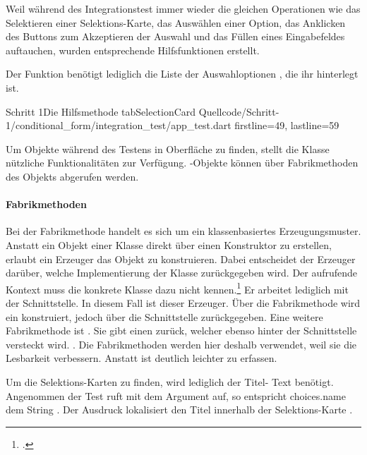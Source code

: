 Weil während des Integrationstest immer wieder die gleichen Operationen wie das Selektieren einer Selektions-Karte, das Auswählen einer Option, das Anklicken des Buttons zum Akzeptieren der Auswahl und das Füllen eines Eingabefeldes auftauchen, wurden entsprechende Hilfsfunktionen erstellt.


Der Funktion  \Lst{\ref{lst:Schritt1HilfsmethodeTabSelectionCard}} benötigt lediglich die Liste der Auswahloptionen , die ihr hinterlegt ist.
 

\begin{alexlisting}{Schritt 1}{Die Hilfsmethode tabSelectionCard}
  {Quellcode/Schritt-1/conditional_form/integration_test/app_test.dart}
  {firstline=49, lastline=59}
  \label{lst:Schritt1HilfsmethodeTabSelectionCard}
\end{alexlisting}

Um Objekte während des Testens in Oberfläche zu finden, stellt die Klasse  nützliche Funktionalitäten zur Verfügung.
-Objekte können über Fabrikmethoden des Objekts  abgerufen werden.

\paragraph{Fabrikmethoden}
Bei der Fabrikmethode handelt es sich um ein klassenbasiertes Erzeugungsmuster.
Anstatt ein Objekt einer Klasse direkt über einen Konstruktor zu erstellen, erlaubt ein Erzeuger das Objekt zu konstruieren.
Dabei entscheidet der Erzeuger darüber, welche Implementierung der Klasse zurückgegeben wird.
Der aufrufende Kontext muss die konkrete Klasse dazu nicht kennen.\footcite[Vgl.][107-116]{gamma2009entwurfsmuster} Er arbeitet lediglich mit der Schnittstelle. In diesem Fall ist  dieser Erzeuger. Über die Fabrikmethode  wird ein  konstruiert, jedoch über die Schnittstelle  zurückgegeben. Eine weitere Fabrikmethode ist . Sie gibt einen  zurück, welcher ebenso hinter der Schnittstelle  versteckt wird. . Die Fabrikmethoden werden hier deshalb verwendet, weil sie die Lesbarkeit verbessern. Anstatt  ist  deutlich leichter zu erfassen.



Um die Selektions-Karten zu finden, wird lediglich der Titel- Text benötigt.
Angenommen der Test ruft  mit dem Argument  auf, so entspricht choices.name dem String . Der Ausdruck  lokalisiert den Titel innerhalb der Selektions-Karte . 

